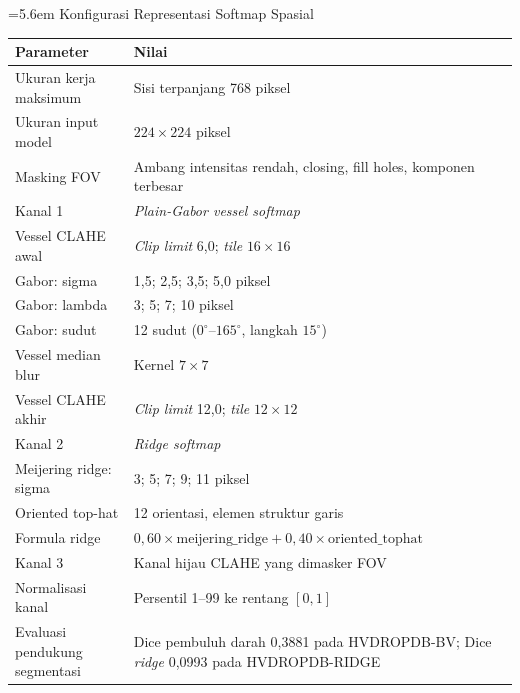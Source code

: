 \clearpage


\label{lamp:vessel_config}

\noindent\hangindent=5.6em
%
Konfigurasi Representasi Softmap Spasial

\vspace{4pt}

\noindent
\begin{tabularx}{\textwidth}{l X}
  \toprule
  \textbf{Parameter} & \textbf{Nilai} \\
  \midrule
  Ukuran kerja maksimum & Sisi terpanjang 768 piksel \\
  Ukuran input model & $224 \times 224$ piksel \\
  Masking FOV & Ambang intensitas rendah, closing, fill holes, komponen terbesar \\
  Kanal 1 & \textit{Plain-Gabor vessel softmap} \\
  Vessel CLAHE awal & \textit{Clip limit} 6,0; \textit{tile} $16 \times 16$ \\
  Gabor: sigma & 1,5; 2,5; 3,5; 5,0 piksel \\
  Gabor: lambda & 3; 5; 7; 10 piksel \\
  Gabor: sudut & 12 sudut ($0^\circ$--$165^\circ$, langkah $15^\circ$) \\
  Vessel median blur & Kernel $7 \times 7$ \\
  Vessel CLAHE akhir & \textit{Clip limit} 12,0; \textit{tile} $12 \times 12$ \\
  Kanal 2 & \textit{Ridge softmap} \\
  Meijering ridge: sigma & 3; 5; 7; 9; 11 piksel \\
  Oriented top-hat & 12 orientasi, elemen struktur garis \\
  Formula ridge & $0{,}60 \times \text{meijering\_ridge} + 0{,}40 \times \text{oriented\_tophat}$ \\
  Kanal 3 & Kanal hijau CLAHE yang dimasker FOV \\
  Normalisasi kanal & Persentil 1--99 ke rentang $[0, 1]$ \\
  Evaluasi pendukung segmentasi & Dice pembuluh darah 0,3881 pada HVDROPDB-BV; Dice \textit{ridge} 0,0993 pada HVDROPDB-RIDGE \\
  \bottomrule
\end{tabularx}

